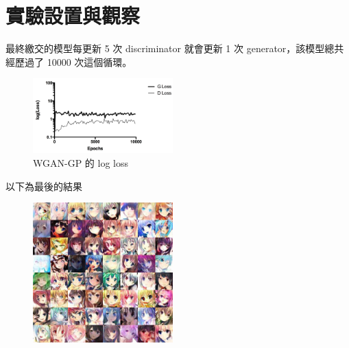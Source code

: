 \documentclass[final,3p]{elsarticle}
\begin{document}
\section{實驗設置與觀察}
	最終繳交的模型每更新 5 次 discriminator 就會更新 1 次 generator，該模型總共經歷過了 10000 次這個循環。
	
	\begin{figure}[H]
		\centering
		\includegraphics[width=0.48\textwidth]{images/wgan_gp_loss}
		\caption{WGAN-GP 的 log loss} \label{fig:wgan_gp_loss}
	\end{figure}
	
	以下為最後的結果
	\begin{figure}[H]
		\centering
		\includegraphics[width=0.48\textwidth]{images/wgan_gp_9900_montage}
	\end{figure}
	
\end{document}
